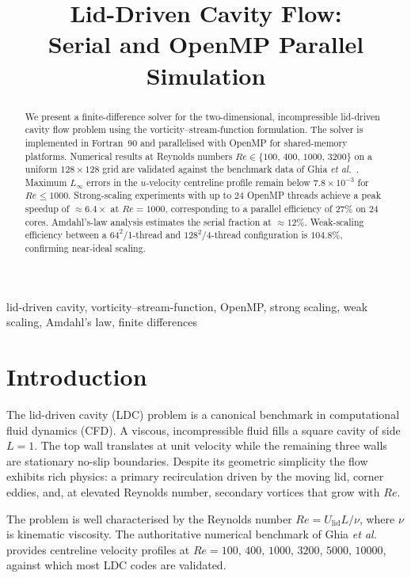 \documentclass[conference]{IEEEtran}
\title{Lid-Driven Cavity Flow:\\
Serial and OpenMP Parallel Simulation}
\author{
  \IEEEauthorblockN{Prady}
  \IEEEauthorblockA{High-Performance Scientific Computing\\
    \textit{prasik2731@gmail.com}}
}
\begin{document}
\maketitle

\begin{abstract}
We present a finite-difference solver for the two-dimensional,
incompressible lid-driven cavity flow problem using the
vorticity--stream-function formulation.
The solver is implemented in Fortran~90 and parallelised with
OpenMP for shared-memory platforms.
Numerical results at Reynolds numbers $Re \in \{100,\,400,\,1000,\,3200\}$
on a uniform $128\times128$ grid are validated against the benchmark
data of Ghia \textit{et al.}~\cite{ghia1982}.
Maximum $L_\infty$ errors in the $u$-velocity centreline profile
remain below $7.8\times10^{-3}$ for $Re \le 1000$.
Strong-scaling experiments with up to 24 OpenMP threads
achieve a peak speedup of $\approx\!6.4\times$ at $Re=1000$,
corresponding to a parallel efficiency of $27\%$ on 24 cores.
Amdahl's-law analysis estimates the serial fraction at $\approx\!12\%$.
Weak-scaling efficiency between a $64^2$/1-thread and $128^2$/4-thread
configuration is $104.8\%$, confirming near-ideal scaling.
\end{abstract}

\begin{IEEEkeywords}
lid-driven cavity, vorticity--stream-function, OpenMP, strong scaling,
weak scaling, Amdahl's law, finite differences
\end{IEEEkeywords}

\section{Introduction}

The lid-driven cavity (LDC) problem is a canonical benchmark in
computational fluid dynamics (CFD).
A viscous, incompressible fluid fills a square cavity of side $L=1$.
The top wall translates at unit velocity while the remaining three walls
are stationary no-slip boundaries.
Despite its geometric simplicity the flow exhibits rich physics:
a primary recirculation driven by the moving lid, corner eddies,
and, at elevated Reynolds number, secondary vortices that grow with $Re$.

The problem is well characterised by the Reynolds number
$Re = U_{\mathrm{lid}} L / \nu$, where $\nu$ is kinematic viscosity.
The authoritative numerical benchmark of Ghia \textit{et al.}~\cite{ghia1982}
provides centreline velocity profiles at
$Re = 100,\,400,\,1000,\,3200,\,5000,\,10000$,
against which most LDC codes are validated.
\end{document}
